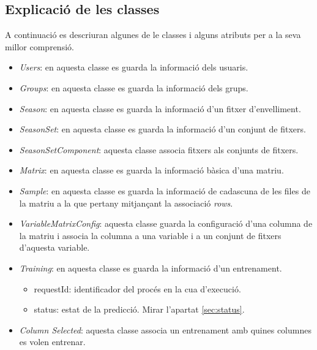 \subsection{Explicaci\'{o} de les classes}
A continuaci\'{o} es descriuran algunes de le classes i alguns atributs per a la seva millor comprensi\'{o}.
\begin{itemize}
\item \textit{Users}: en aquesta classe es guarda la informaci\'{o} dels usuaris.

\item \textit{Groups}: en aquesta classe es guarda la informaci\'{o} dels grups. 

\item \textit{Season}: en aquesta classe es guarda la informaci\'{o} d'un fitxer d'envelliment.

\item \textit{SeasonSet}: en aquesta classe es guarda la informaci\'{o} d'un conjunt de fitxers.

\item \textit{SeasonSetComponent}: aquesta classe associa fitxers als conjunts de fitxers.

\item \textit{Matrix}: en aquesta classe es guarda la informaci\'{o} b\`{a}sica d'una matriu.

\item \textit{Sample}: en aquesta classe es guarda la informaci\'{o} de cadascuna de les files de la matriu a la que pertany mitjançant la associaci\'{o} \textit{rows}.

\item \textit{VariableMatrixConfig}: aquesta classe guarda la configuraci\'{o} d'una columna de la matriu i associa la columna a una variable i a un conjunt de fitxers d'aquesta variable.

\item \textit{Training}: en aquesta classe es guarda la informaci\'{o} d'un entrenament.
\begin{itemize}
\item requestId: identificador del proc\'{e}s en la cua d'execuci\'{o}.
\item status: estat de la predicci\'{o}. Mirar l'apartat \ref{sec:status}.
\end{itemize}

\item \textit{Column Selected}: aquesta classe associa un entrenament amb quines columnes es volen entrenar.


\end{itemize}
